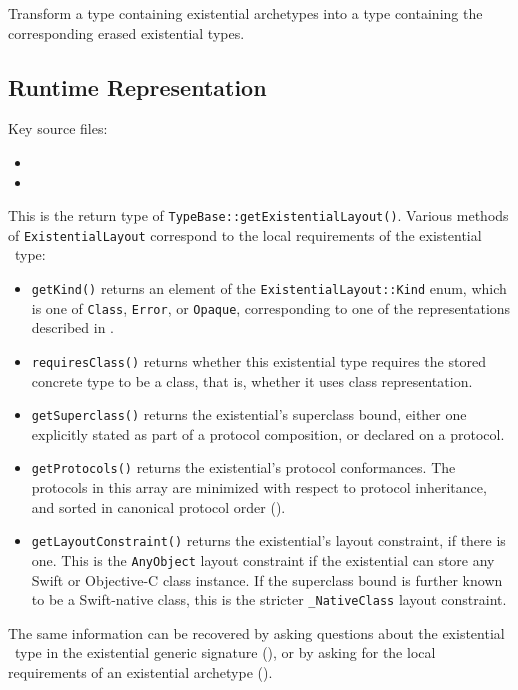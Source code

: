 \documentclass[../generics]{subfiles}
\begin{document}
Transform a type containing existential archetypes into a type containing the corresponding erased existential types.

\subsection*{Runtime Representation}

Key source files:
\begin{itemize}
\item {}
\item {}
\end{itemize}

This is the return type of \texttt{TypeBase::getExistentialLayout()}. Various methods of \texttt{ExistentialLayout} correspond to the local requirements of the existential \tSelf\ type:
\begin{itemize}
\item \texttt{getKind()} returns an element of the \texttt{ExistentialLayout::Kind} enum, which is one of \texttt{Class}, \texttt{Error}, or \texttt{Opaque}, corresponding to one of the representations described in .
\item \texttt{requiresClass()} returns whether this existential type requires the stored concrete type to be a class, that is, whether it uses class representation.
\item \texttt{getSuperclass()} returns the existential's superclass bound, either one explicitly stated as part of a protocol composition, or declared on a protocol.
\item \texttt{getProtocols()} returns the existential's protocol conformances. The protocols in this array are minimized with respect to protocol inheritance, and sorted in canonical protocol order ().
\item \texttt{getLayoutConstraint()} returns the existential's layout constraint, if there is one. This is the \texttt{AnyObject} layout constraint if the existential can store any Swift or Objective-C class instance. If the superclass bound is further known to be a Swift-native class, this is the stricter \verb|_NativeClass| layout constraint.
\end{itemize}
The same information can be recovered by asking questions about the existential \tSelf\ type in the existential generic signature (), or by asking for the local requirements of an existential archetype ().
\end{document}
